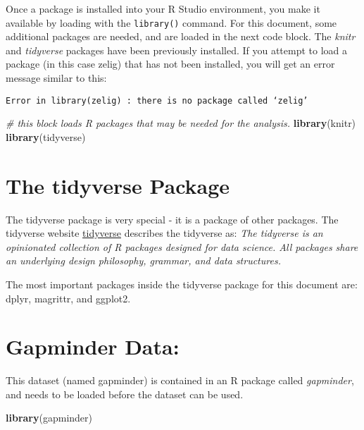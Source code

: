 \documentclass[
]{book}
\newenvironment{Shaded}{\begin{snugshade}}{\end{snugshade}}
\newcommand{\CommentTok}[1]{\textcolor[rgb]{0.56,0.35,0.01}{\textit{#1}}}
\newcommand{\KeywordTok}[1]{\textcolor[rgb]{0.13,0.29,0.53}{\textbf{#1}}}
\newcommand{\NormalTok}[1]{#1}
\begin{document}
Once a package is installed into your R Studio environment, you make it available by loading with the \texttt{library()} command. For this document, some additional packages are needed, and are loaded in the next code block. The \emph{knitr} and \emph{tidyverse} packages have been previously installed. If you attempt to load a package (in this case zelig) that has not been installed, you will get an error message similar to this:

\texttt{Error\ in\ library(zelig)\ :\ there\ is\ no\ package\ called\ ‘zelig’}

\begin{Shaded}
\begin{Highlighting}[]
\CommentTok{# this block loads R packages that may be needed for the analysis.}
\KeywordTok{library}\NormalTok{(knitr)}
\KeywordTok{library}\NormalTok{(tidyverse)}
\end{Highlighting}
\end{Shaded}

\hypertarget{the-tidyverse-package}{%
\section{The tidyverse Package}\label{the-tidyverse-package}}

The tidyverse package is very special - it is a package of other packages. The tidyverse website \href{http://tidyverse.org}{tidyverse} describes the tidyverse as: \emph{The tidyverse is an opinionated collection of R packages designed for data science. All packages share an underlying design philosophy, grammar, and data structures.}

The most important packages inside the tidyverse package for this document are: dplyr, magrittr, and ggplot2.

\hypertarget{gapminder-data}{%
\section{Gapminder Data:}\label{gapminder-data}}

This dataset (named gapminder) is contained in an R package called \emph{gapminder}, and needs to be loaded before the dataset can be used.

\begin{Shaded}
\begin{Highlighting}[]
\KeywordTok{library}\NormalTok{(gapminder)}
\end{Highlighting}
\end{Shaded}
\end{document}
